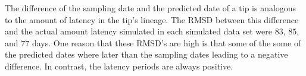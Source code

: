 \documentclass[12pt]{article}
\begin{document}
The difference of the sampling date and the predicted date of a tip is analogous to the amount of latency in the tip's lineage.
The RMSD between this difference and the actual amount latency simulated in each simulated data set were $83$, $85$, and $77$ days.
One reason that these RMSD's are high is that some of the some of the predicted dates where later than the sampling dates leading to a negative difference. In contrast, the latency periods are always positive.



\end{document}
